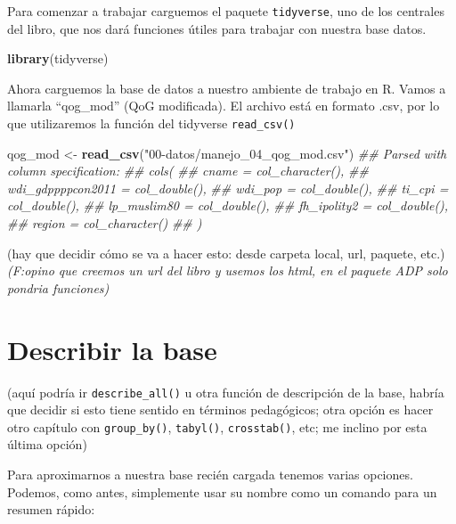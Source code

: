 \documentclass[]{book}
\newenvironment{Shaded}{\begin{snugshade}}{\end{snugshade}}
\newcommand{\CommentTok}[1]{\textcolor[rgb]{0.56,0.35,0.01}{\textit{#1}}}
\newcommand{\KeywordTok}[1]{\textcolor[rgb]{0.13,0.29,0.53}{\textbf{#1}}}
\newcommand{\NormalTok}[1]{#1}
\newcommand{\StringTok}[1]{\textcolor[rgb]{0.31,0.60,0.02}{#1}}
\begin{document}
Para comenzar a trabajar carguemos el paquete \texttt{tidyverse}, uno de
los centrales del libro, que nos dará funciones útiles para trabajar con
nuestra base datos.

\begin{Shaded}
\begin{Highlighting}[]
\KeywordTok{library}\NormalTok{(tidyverse)}
\end{Highlighting}
\end{Shaded}

Ahora carguemos la base de datos a nuestro ambiente de trabajo en R.
Vamos a llamarla ``qog\_mod'' (QoG modificada). El archivo está en
formato .csv, por lo que utilizaremos la función del tidyverse
\texttt{read\_csv()}

\begin{Shaded}
\begin{Highlighting}[]
\NormalTok{qog_mod <-}\StringTok{ }\KeywordTok{read_csv}\NormalTok{(}\StringTok{"00-datos/manejo_04_qog_mod.csv"}\NormalTok{)}
\CommentTok{## Parsed with column specification:}
\CommentTok{## cols(}
\CommentTok{##   cname = col_character(),}
\CommentTok{##   wdi_gdppppcon2011 = col_double(),}
\CommentTok{##   wdi_pop = col_double(),}
\CommentTok{##   ti_cpi = col_double(),}
\CommentTok{##   lp_muslim80 = col_double(),}
\CommentTok{##   fh_ipolity2 = col_double(),}
\CommentTok{##   region = col_character()}
\CommentTok{## )}
\end{Highlighting}
\end{Shaded}

(hay que decidir cómo se va a hacer esto: desde carpeta local, url,
paquete, etc.) \emph{(F:opino que creemos un url del libro y usemos los
html, en el paquete ADP solo pondria funciones)}

\hypertarget{describir-la-base}{%
\section{Describir la base}\label{describir-la-base}}

(aquí podría ir \texttt{describe\_all()} u otra función de descripción
de la base, habría que decidir si esto tiene sentido en términos
pedagógicos; otra opción es hacer otro capítulo con
\texttt{group\_by()}, \texttt{tabyl()}, \texttt{crosstab()}, etc; me
inclino por esta última opción)

Para aproximarnos a nuestra base recién cargada tenemos varias opciones.
Podemos, como antes, simplemente usar su nombre como un comando para un
resumen rápido:
\end{document}
